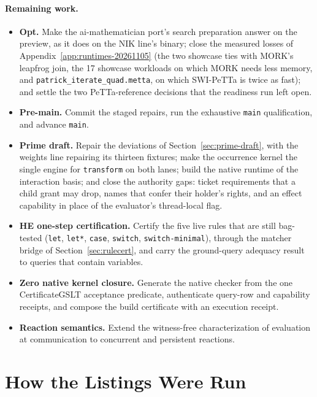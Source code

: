 \documentclass[11pt]{article}
\newcommand{\code}[1]{\texttt{#1}}
\newcommand{\PeTTa}{\textup{PeTTa}}
\newcommand{\HE}{\textup{HE}}
\begin{document}
\paragraph{Remaining work.}
\begin{itemize}
\item \textbf{Opt.} Make the ai-mathematician port's search preparation
  answer on the preview, as it does on the NIK line's binary; close the
  measured losses of Appendix~\ref{app:runtimes-20261105}
  (the two showcase ties with MORK's leapfrog join, the 17 showcase workloads
on which MORK needs less memory, and \nolinkurl{patrick_iterate_quad.metta},
on which SWI-\PeTTa{} is twice as fast); and settle the two \PeTTa{}-reference decisions that
  the readiness run left open.
\item \textbf{Pre-main.} Commit the staged repairs, run the exhaustive
  \code{main} qualification, and advance \code{main}.
\item \textbf{Prime draft.} Repair the deviations of
  Section~\ref{sec:prime-draft}, with the weights line repairing its thirteen
  fixtures; make the occurrence kernel the single engine for \code{transform}
  on both lanes; build the native runtime of the interaction basis; and close
  the authority gaps: ticket requirements that a child grant may drop, names
  that confer their holder's rights, and an effect capability in place of the
  evaluator's thread-local flag.
\item \textbf{\HE{} one-step certification.} Certify the five live rules that
  are still bag-tested (\code{let}, \code{let*}, \code{case}, \code{switch},
  \code{switch-minimal}), through the matcher bridge of
  Section~\ref{sec:rulecert}, and carry the ground-query adequacy result to
  queries that contain variables.
\item \textbf{Zero native kernel closure.} Generate the native checker from the
  one CertificateGSLT acceptance predicate, authenticate query-row and
  capability receipts, and compose the build certificate with an execution
  receipt.
\item \textbf{Reaction semantics.} Extend the witness-free characterization of
  evaluation at communication to concurrent and persistent reactions.
\end{itemize}


\appendix



\section{How the Listings Were Run}
\label{app:runs}
\end{document}
